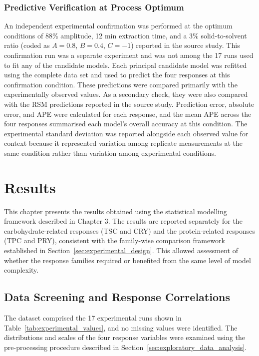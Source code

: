 \documentclass[MScDSA]{uccthesis}
\begin{document}
\subsection{Predictive Verification at Process Optimum}
\label{sec:predictive_verification}
An independent experimental confirmation was performed at the optimum conditions of 88\% amplitude, 12 min extraction time, and a 3\% solid-to-solvent ratio (coded as $A=0.8$, $B=0.4$, $C={-1}$) reported in the source study. This confirmation run was a separate experiment and was not among the 17 runs used to fit any of the candidate models. Each principal candidate model was refitted using the complete data set and used to predict the four responses at this confirmation condition. These predictions were compared primarily with the experimentally observed values. As a secondary check, they were also compared with the RSM predictions reported in the source study. Prediction error, absolute error, and APE were calculated for each response, and the mean APE across the four responses summarised each model's overall accuracy at this condition. The experimental standard deviation was reported alongside each observed value for context because it represented variation among replicate measurements at the same condition rather than variation among experimental conditions.

\chapter{Results}
This chapter presents the results obtained using the statistical modelling framework described in Chapter 3. The results are reported separately for the carbohydrate-related responses (TSC and CRY) and the protein-related responses (TPC and PRY), consistent with the family-wise comparison framework established in Section~\ref{sec:experimental_design}. This allowed assessment of whether the response families required or benefited from the same level of model complexity.

\section{Data Screening and Response Correlations}
\label{sec:data_screening}
The dataset comprised the 17 experimental runs shown in Table~\ref{tab:experimental_values}, and no missing values were identified. The distributions and scales of the four response variables were examined using the pre-processing procedure described in Section~\ref{sec:exploratory_data_analysis}.
\end{document}
